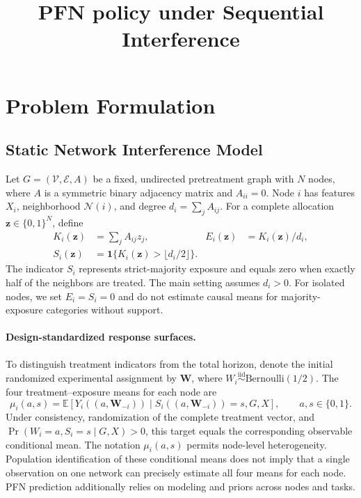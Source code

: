 \documentclass[a4paper,11pt]{article}
\title{PFN policy under Sequential Interference}
\author{}
\date{}
\newcommand{\E}{\mathbb E}
\newcommand{\ind}{\mathbf 1}
\numberwithin{equation}{section}
\begin{document}
\maketitle


\section{Problem Formulation}
\subsection{Static Network Interference Model}
\label{sec:static-model}
Let $G=(\mathcal V,\mathcal E,A)$ be a fixed, undirected pretreatment graph with $N$ nodes, where $A$ is a symmetric binary adjacency matrix and $A_{ii}=0$. Node $i$ has features $X_i$, neighborhood $\mathcal N(i)$, and degree $d_i=\sum_j A_{ij}$. For a complete allocation $\mathbf z\in\{0,1\}^N$, define
\begin{align}
K_i(\mathbf z)&=\sum_j A_{ij}z_j,
&E_i(\mathbf z)&=K_i(\mathbf z)/d_i,\\
S_i(\mathbf z)&=\ind\{K_i(\mathbf z)>\lfloor d_i/2\rfloor\}.
\end{align}
The indicator $S_i$ represents strict-majority exposure and equals zero when exactly half of the neighbors are treated. The main setting assumes $d_i>0$. For isolated nodes, we set $E_i=S_i=0$ and do not estimate causal means for majority-exposure categories without support.

\paragraph{Design-standardized response surfaces.}
To distinguish treatment indicators from the total horizon, denote the initial randomized experimental assignment by $\mathbf W$, where $W_i\overset{\mathrm{iid}}{\sim}\mathrm{Bernoulli}(1/2)$. The four treatment--exposure means for each node are
\begin{equation}
\mu_i(a,s)=\E\!\left[Y_i((a,\mathbf W_{-i}))
\mid S_i((a,\mathbf W_{-i}))=s,G,X\right],\qquad a,s\in\{0,1\}.
\label{eq:mu}
\end{equation}
Under consistency, randomization of the complete treatment vector, and $\Pr(W_i=a,S_i=s\mid G,X)>0$, this target equals the corresponding observable conditional mean. The notation $\mu_i(a,s)$ permits node-level heterogeneity. Population identification of these conditional means does not imply that a single observation on one network can precisely estimate all four means for each node. PFN prediction additionally relies on modeling and priors across nodes and tasks.
\end{document}
